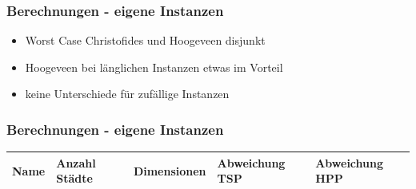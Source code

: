 \documentclass[12pt]{beamer}
\begin{document}
    \begin{frame}
        \frametitle{Berechnungen - eigene Instanzen}
	    \begin{itemize}
                \item Worst Case Christofides und Hoogeveen disjunkt
                \item Hoogeveen bei länglichen Instanzen etwas im Vorteil
                \item keine Unterschiede für zufällige Instanzen
            \end{itemize}
    \end{frame}
    \begin{frame}
        \frametitle{Berechnungen - eigene Instanzen}
           \begin{table}[H]
                \centering
                \tiny \begin{tabular}{| p{1.0cm} | p{1.0cm} | p{1.5cm} | p{1.5cm} | p{1.5cm} |}
                    \hline
                    \tiny{\textbf{Name}} &
                    \tiny{\textbf{Anzahl Städte}}  & 
                    \tiny{\textbf{Dimensionen}} & 
                    \tiny{\textbf{Abweichung TSP}} & 
                    \tiny{\textbf{Abweichung HPP}} \\ \hline


\end{tabular}
\end{table}
\end{frame}
\end{document}
